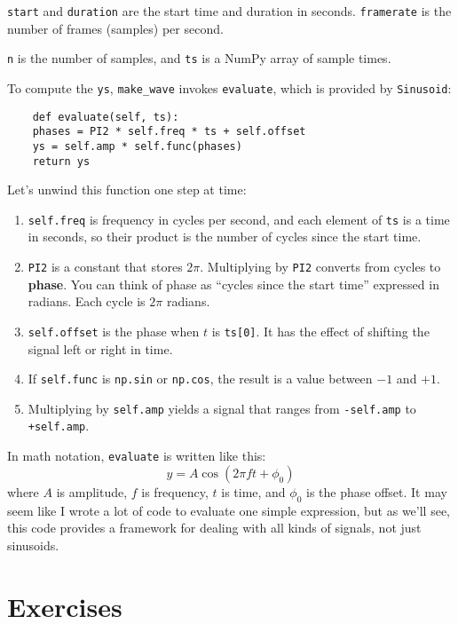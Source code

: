 {\tt start} and {\tt duration} are the start time and duration
in seconds.  {\tt framerate} is the number of frames (samples)
per second.

{\tt n} is the number of samples, and {\tt ts} is a NumPy array
of sample times.

To compute the {\tt ys}, \verb"make_wave" invokes {\tt evaluate},
which is provided by {\tt Sinusoid}:

\begin{verbatim}
	def evaluate(self, ts):
	phases = PI2 * self.freq * ts + self.offset
	ys = self.amp * self.func(phases)
	return ys
\end{verbatim}

Let's unwind this function one step at time:

\begin{enumerate}
	
	\item {\tt self.freq} is frequency in cycles per second, and each
	element of {\tt ts} is a time in seconds, so their product is the
	number of cycles since the start time.
	
	\item {\tt PI2} is a constant that stores $2 \pi$.  Multiplying by
	{\tt PI2} converts from cycles to {\bf phase}.  You can think of
	phase as ``cycles since the start time'' expressed in radians.  Each
	cycle is $2 \pi$ radians.
	
	\item {\tt self.offset} is the phase when $t$ is {\tt ts[0]}.
	It has the effect of shifting the signal left or right in time.
	
	\item If {\tt self.func} is {\tt np.sin} or {\tt np.cos}, the result is a
	value between $-1$ and $+1$.
	
	\item Multiplying by {\tt self.amp} yields a signal that ranges from
	{\tt -self.amp} to {\tt +self.amp}.
	
\end{enumerate}

In math notation, {\tt evaluate} is written like this:
%
\[ y = A \cos (2 \pi f t + \phi_0) \]
%
where $A$ is amplitude, $f$ is frequency, $t$ is time, and $\phi_0$
is the phase offset.  It may seem like I wrote a lot of code
to evaluate one simple expression, but as we'll see, this code
provides a framework for dealing with all kinds of signals, not
just sinusoids.


\section{Exercises}

